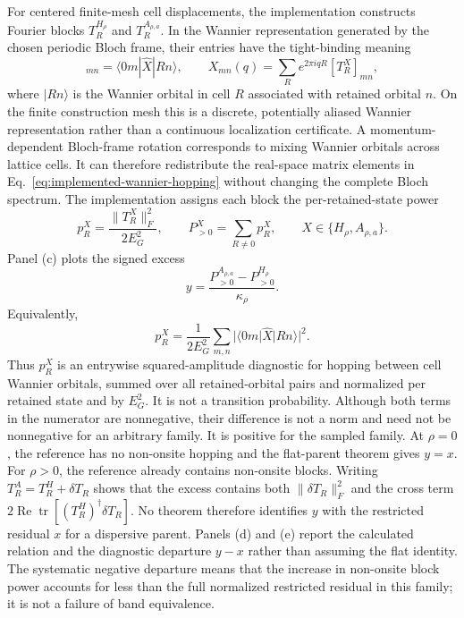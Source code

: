 \documentclass[11pt]{article}
\begin{document}
For centered finite-mesh cell displacements, the implementation constructs Fourier
blocks $T_R^{H_\rho}$ and $T_R^{A_{\rho,a}}$. In the Wannier representation generated
by the chosen periodic Bloch frame, their entries have the tight-binding meaning
\begin{equation}
 [T_R^X]_{mn}=\langle 0m|\widehat X|Rn\rangle,
 \qquad
 X_{mn}(q)=\sum_R e^{2\pi iqR}[T_R^X]_{mn},
 \label{eq:implemented-wannier-hopping}
\end{equation}
where $|Rn\rangle$ is the Wannier orbital in cell $R$ associated with retained orbital
$n$. On the finite construction mesh this is a discrete, potentially aliased Wannier
representation rather than a continuous localization certificate. A momentum-dependent
Bloch-frame rotation corresponds to mixing Wannier orbitals across lattice cells. It can
therefore redistribute the real-space matrix elements in
Eq.~\eqref{eq:implemented-wannier-hopping} without changing the complete Bloch spectrum.
The implementation assigns each block the per-retained-state power
\begin{equation}
 p_R^X=\frac{\|T_R^X\|_F^2}{2E_G^2},
 \qquad
 P_{>0}^X=\sum_{R\ne0}p_R^X,
 \qquad X\in\{H_\rho,A_{\rho,a}\}.
 \label{eq:implemented-hopping-power}
\end{equation}
Panel (c) plots the signed excess
\begin{equation}
 y=\frac{P_{>0}^{A_{\rho,a}}-P_{>0}^{H_\rho}}{\kappa_\rho}.
 \label{eq:implemented-normalized-excess}
\end{equation}
Equivalently,
\begin{equation}
 p_R^X=\frac{1}{2E_G^2}\sum_{m,n}
 |\langle 0m|\widehat X|Rn\rangle|^2.
 \label{eq:implemented-hopping-power-matrix-elements}
\end{equation}
Thus $p_R^X$ is an entrywise squared-amplitude diagnostic for hopping between cell
Wannier orbitals, summed over all retained-orbital pairs and normalized per retained
state and by $E_G^2$. It is not a transition probability. Although both terms in the
numerator are nonnegative,
their difference is not a norm and need not be nonnegative for an arbitrary family. It
is positive for the sampled family.
At $\rho=0$, the reference has no non-onsite hopping and the flat-parent theorem gives
$y=x$. For $\rho>0$, the reference already contains non-onsite blocks. Writing
$T_R^{A}=T_R^{H}+\delta T_R$ shows that the excess contains both
$\|\delta T_R\|_F^2$ and the cross term
$2\operatorname{Re}\operatorname{tr}[(T_R^H)^\dagger\delta T_R]$. No theorem therefore
identifies $y$ with the restricted residual $x$ for a dispersive parent. Panels (d) and
(e) report the calculated relation and the diagnostic departure $y-x$ rather than
assuming the flat identity. The systematic negative departure means that the increase in
non-onsite block power accounts for less than the full normalized restricted residual in
this family; it is not a failure of band equivalence.
\end{document}
